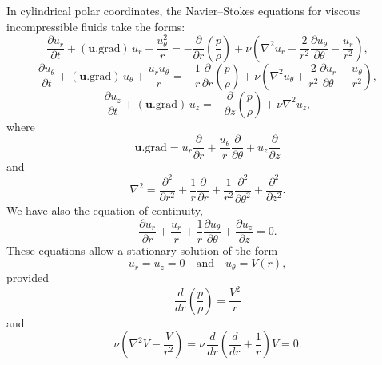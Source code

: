 In cylindrical polar coordinates, the Navier--Stokes equations for
viscous incompressible fluids take the forms:
\begin{equation}
\label{eq:7-134}
\frac{\partial u_r}{\partial t}
+ (\mathbf{u}.\mathrm{grad})\,u_r - \frac{u_\theta^2}{r}
= -\frac{\partial}{\partial r}\!\left(\frac{p}{\rho}\right)
+ \nu\!\left(\nabla^2 u_r - \frac{2}{r^2}\frac{\partial u_\theta}{\partial \theta}
- \frac{u_r}{r^2}\right),
\end{equation}
\begin{equation}
\label{eq:7-135}
\frac{\partial u_\theta}{\partial t}
+ (\mathbf{u}.\mathrm{grad})\,u_\theta + \frac{u_r u_\theta}{r}
= -\frac{1}{r}\frac{\partial}{\partial r}\!\left(\frac{p}{\rho}\right)
+ \nu\!\left(\nabla^2 u_\theta + \frac{2}{r^2}\frac{\partial u_r}{\partial \theta}
- \frac{u_\theta}{r^2}\right),
\end{equation}
\begin{equation}
\label{eq:7-136}
\frac{\partial u_z}{\partial t}
+ (\mathbf{u}.\mathrm{grad})\,u_z
= -\frac{\partial}{\partial z}\!\left(\frac{p}{\rho}\right)
+ \nu \nabla^2 u_z,
\end{equation}
where
\begin{equation}
\label{eq:7-137}
\mathbf{u}.\mathrm{grad} = u_r \frac{\partial}{\partial r}
+ \frac{u_\theta}{r}\frac{\partial}{\partial \theta}
+ u_z \frac{\partial}{\partial z}
\end{equation}
and
\begin{equation}
\label{eq:7-138}
\nabla^2 = \frac{\partial^2}{\partial r^2}
+ \frac{1}{r}\frac{\partial}{\partial r}
+ \frac{1}{r^2}\frac{\partial^2}{\partial \theta^2}
+ \frac{\partial^2}{\partial z^2}.
\end{equation}
We have also the equation of continuity,
\begin{equation}
\label{eq:7-139}
\frac{\partial u_r}{\partial r}
+ \frac{u_r}{r}
+ \frac{1}{r}\frac{\partial u_\theta}{\partial \theta}
+ \frac{\partial u_z}{\partial z} = 0.
\end{equation}
These equations allow a stationary solution of the form
\begin{equation}
\label{eq:7-140}
u_r = u_z = 0 \quad \text{and} \quad u_\theta = V(r),
\end{equation}
provided
\begin{equation}
\label{eq:7-141}
\frac{d}{dr}\!\left(\frac{p}{\rho}\right) = \frac{V^2}{r}
\end{equation}
and
\begin{equation}
\label{eq:7-142}
\nu\!\left(\nabla^2 V - \frac{V}{r^2}\right)
= \nu\,\frac{d}{dr}\!\left(\frac{d}{dr}+\frac{1}{r}\right)V = 0.
\end{equation}
